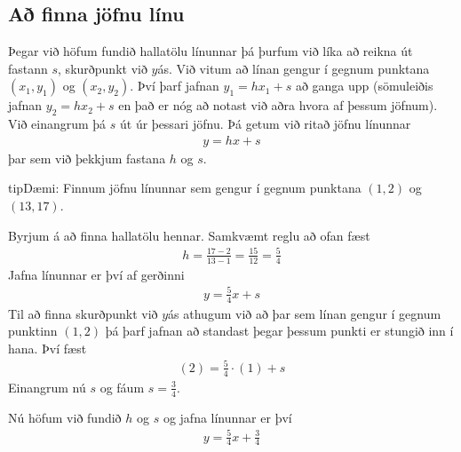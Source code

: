 \documentclass[a4paper,10pt,icelandic]{sphinxmanual}
\begin{document}
\subsection{Að finna jöfnu línu}
\label{\detokenize{Kafli03:a-finna-jofnu-linu}}
Þegar við höfum fundið hallatölu línunnar þá þurfum við líka að reikna út fastann \(s\), skurðpunkt við \(y\)\sphinxhyphen{}ás. Við vitum að línan gengur í gegnum punktana \((x_1,y_1)\) og \((x_2,y_2)\). Því þarf jafnan \(y_1=hx_1+s\) að ganga upp (sömuleiðis jafnan \(y_2=hx_2+s\) en það er nóg að notast við aðra hvora af þessum jöfnum). Við einangrum þá \(s\) út úr þessari jöfnu. Þá getum við ritað jöfnu línunnar
\begin{equation*}
\begin{split}y=hx+s\end{split}
\end{equation*}
þar sem við þekkjum fastana \(h\) og \(s\).

\begin{sphinxadmonition}{tip}{Dæmi:}
Finnum jöfnu línunnar sem gengur í gegnum punktana \((1,2)\) og \((13,17)\).

Byrjum á að finna hallatölu hennar. Samkvæmt reglu að ofan fæst
\begin{equation*}
\begin{split}h=\frac{17-2}{13-1}=\frac{15}{12}=\frac54\end{split}
\end{equation*}
Jafna línunnar er því af gerðinni
\begin{equation*}
\begin{split}y=\frac54 x +s\end{split}
\end{equation*}
Til að finna skurðpunkt við \(y\)\sphinxhyphen{}ás athugum við að þar sem línan gengur í gegnum punktinn \((1,2)\) þá þarf jafnan að standast þegar þessum punkti er stungið inn í hana. Því fæst
\begin{equation*}
\begin{split}(2)=\frac54 \cdot (1) +s\end{split}
\end{equation*}
Einangrum nú \(s\) og fáum \(s=\frac34\).

Nú höfum við fundið \(h\) og \(s\) og jafna línunnar er því
\begin{equation*}
\begin{split}y=\frac54 x + \frac34\end{split}
\end{equation*}
\end{sphinxadmonition}
\end{document}
